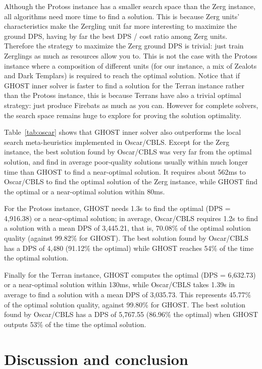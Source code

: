 \documentclass[journal]{IEEEtran}
\newcommand{\ghost}{\textsc{GHOST}\xspace}
\begin{document}
Although the Protoss instance has a smaller search space than the Zerg
instance, all algorithms  need more time to find a  solution.  This is
because Zerg  units' characteristics make  the Zergling unit  far more
interesting to maximize  the ground DPS, having by far  the best DPS /
cost ratio among  Zerg units.  Therefore the strategy  to maximize the
Zerg ground DPS is trivial: just  train Zerglings as much as resources
allow you to. This  is not the case with the  Protoss instance where a
composition of different units (for our instance, a mix of Zealots and
Dark Templars) is required to  reach the optimal solution. Notice that
if \ghost  inner solver is  faster to find  a solution for  the Terran
instance rather  than the  Protoss instance,  this is  because Terrans
have also a trivial optimal strategy: just produce Firebats as much as
you can. However  for complete solvers, the search  space remains huge
to explore for proving the solution optimality.

Table~\ref{tab:oscar} shows that \ghost  inner solver also outperforms
the local search meta-heuristics implemented in Oscar/CBLS. Except for
the Zerg instance, the best solution  found by Oscar/CBLS was very far
from the optimal solution, and  find in average poor-quality solutions
usually within  much longer  time than \ghost  to find  a near-optimal
solution. It  requires about 562ms  to Oscar/CBLS to find  the optimal
solution of  the Zerg  instance, while  \ghost find  the optimal  or a
near-optimal solution within 80ms.  

For the Protoss instance, \ghost needs 1.3s to find the optimal (DPS =
4,916.38) or a near-optimal  solution; in average, Oscar/CBLS requires
1.2s to find a solution with a  mean DPS of 3,445.21, that is, 70.08\%
of the optimal solution quality (against 99.82\% for \ghost). The best
solution found by Oscar/CBLS has a  DPS of 4,480 (91.12\% the optimal)
while \ghost reaches 54\% of the time the optimal solution.

Finally for  the Terran instance,  \ghost computes the optimal  (DPS =
6,632.73) or  a near-optimal  solution within 130ms,  while Oscar/CBLS
takes 1.39s in average to find a solution with a mean DPS of 3,035.73.
This  represents  45.77\% of  the  optimal  solution quality,  against
99.80\% for \ghost. The best solution found by Oscar/CBLS has a DPS of
5,767.55 (86.96\%  the optimal) when  \ghost outputs 53\% of  the time
the optimal solution.



\section{Discussion and conclusion}\label{sec:conclusion}
\end{document}
